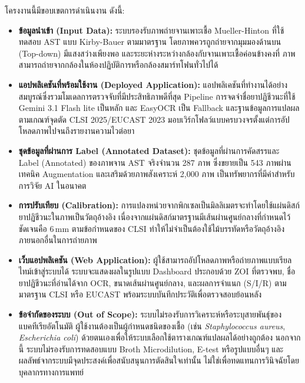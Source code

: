 โครงงานนี้มีขอบเขตการดำเนินงาน ดังนี้:

\begin{itemize}
  \item \textbf{ข้อมูลนำเข้า (Input Data):} ระบบรองรับภาพถ่ายจานเพาะเชื้อ Mueller-Hinton ที่ใช้ทดสอบ AST แบบ Kirby-Bauer ตามมาตรฐาน โดยภาพควรถูกถ่ายจากมุมมองด้านบน (Top-down) มีแสงสว่างเพียงพอ และระยะห่างระหว่างกล้องกับจานเพาะเชื้อค่อนข้างคงที่ ภาพสามารถถ่ายจากกล้องในห้องปฏิบัติการหรือกล้องสมาร์ทโฟนทั่วไปได้

  \item \textbf{แอปพลิเคชันที่พร้อมใช้งาน (Deployed Application):} แอปพลิเคชันที่ทำงานได้อย่างสมบูรณ์ซึ่งรวมโมเดลการตรวจจับที่มีประสิทธิภาพดีที่สุด Pipeline การจดจำชื่อยาปฏิชีวนะที่ใช้ Gemini 3.1 Flash lite เป็นหลัก และ EasyOCR เป็น Fallback และฐานข้อมูลการแปลผลตามเกณฑ์จุดตัด CLSI 2025/EUCAST 2023 มอบเวิร์กโฟลว์แบบครบวงจรตั้งแต่การอัปโหลดภาพไปจนถึงรายงานความไวต่อยา

  \item \textbf{ชุดข้อมูลที่ผ่านการ Label (Annotated Dataset):} ชุดข้อมูลที่ผ่านการคัดสรรและ Label (Annotated) ของภาพจาน AST จริงจำนวน 287 ภาพ ซึ่งขยายเป็น 543 ภาพผ่านเทคนิค Augmentation และเสริมด้วยภาพสังเคราะห์ 2,000 ภาพ เป็นทรัพยากรที่มีค่าสำหรับการวิจัย AI ในอนาคต


  \item \textbf{การปรับเทียบ (Calibration):} การแปลงหน่วยจากพิกเซลเป็นมิลลิเมตรจะทำโดยใช้แผ่นดิสก์ยาปฏิชีวนะในภาพเป็นวัตถุอ้างอิง เนื่องจากแผ่นดิสก์มาตรฐานมีเส้นผ่านศูนย์กลางที่กำหนดไว้ชัดเจนคือ 6\,mm ตามข้อกำหนดของ CLSI ทำให้ไม่จำเป็นต้องใช้ไม้บรรทัดหรือวัตถุอ้างอิงภายนอกอื่นในการถ่ายภาพ

  \item \textbf{เว็บแอปพลิเคชัน (Web Application):} ผู้ใช้สามารถอัปโหลดภาพหรือถ่ายภาพแบบเรียลไทม์เข้าสู่ระบบได้ ระบบจะแสดงผลในรูปแบบ Dashboard ประกอบด้วย ZOI ที่ตรวจพบ, ชื่อยาปฏิชีวนะที่อ่านได้จาก OCR, ขนาดเส้นผ่านศูนย์กลาง, และผลการจำแนก (S/I/R) ตามมาตรฐาน CLSI หรือ EUCAST พร้อมระบบบันทึกประวัติเพื่อตรวจสอบย้อนหลัง

  \item \textbf{ข้อจำกัดของระบบ (Out of Scope):} ระบบไม่รองรับการวิเคราะห์หรือระบุสายพันธุ์ของแบคทีเรียอัตโนมัติ ผู้ใช้งานต้องเป็นผู้กำหนดชนิดของเชื้อ (เช่น \textit{Staphylococcus aureus}, \textit{Escherichia coli}) ด้วยตนเองเพื่อให้ระบบเลือกใช้ตารางเกณฑ์แปลผลได้อย่างถูกต้อง นอกจากนี้ ระบบไม่รองรับการทดสอบแบบ Broth Microdilution, E-test หรือรูปแบบอื่นๆ และผลลัพธ์จากระบบมีจุดประสงค์เพื่อสนับสนุนการตัดสินใจเท่านั้น ไม่ใช่เพื่อทดแทนการวินิจฉัยโดยบุคลากรทางการแพทย์
\end{itemize}

